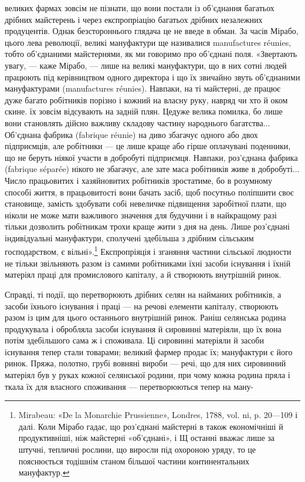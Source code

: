 \parcont{}  %
великих фармах зовсім не пізнати, що вони постали із об’єднання
багатьох дрібних майстерень і через експропріацію багатьох
дрібних незалежних продуцентів. Однак безстороннього глядача
це не введе в обман. За часів Мірабо, цього лева революції, великі
мануфактури ще називалися manufactures réunies, тобто об’єднаними
майстернями, як ми говоримо про об’єднані поля. «Звертають
увагу, — каже Мірабо, — лише на великі мануфактури,
що в них сотні людей працюють під керівництвом одного директора
і що їх звичайно звуть об’єднаними мануфактурами (manufactures
réunies). Навпаки, на ті майстерні, де працює дуже багато
робітників порізно і кожний на власну руку, навряд чи
хто й оком скине. їх зовсім відсувають на задній плян. Цедуже
велика помилка, бо лише вони становлять дійсно важливу складову
частину народнього багатства... Об’єднана фабрика (fabrique
réunie) на диво збагачує одного або двох підприємців, але
робітники — це лише краще або гірше оплачувані поденники,
що не беруть ніякої участи в добробуті підприємця. Навпаки,
роз’єднана фабрика (fabrique séparée) нікого не збагачує, але
зате маса робітників живе в добробуті... Число працьовитих і
хазяйновитих робітників зростатиме, бо в розумному способі
життя, в працьовитості вони бачать засіб, щоб посутньо поліпшити
своє становище, замість здобувати собі невеличке підвищення
заробітної плати, що ніколи не може мати важливого
значення для будучини і в найкращому разі тільки дозволить
робітникам трохи краще жити з дня на день. Лише роз’єднані
індивідуальні мануфактури, сполучені здебільша з дрібним сільським
господарством, є вільні».\footnote{
Mirabeau: «De la Monarchie Prussienne», Londres, 1788, vol. ni,
p. 20—109 і далі. Коли Мірабо гадає, що роз’єднані майстерні в
також економічніші й продуктивніші, ніж майстерні «об’єднані», і Щ
останні вважає лише за штучні, тепличні рослини, що виросли під охороною
уряду, то це пояснюється тодішнім станом більшої частини континентальних
мануфактур.
} Експропріяція і зганяння
частини сільської людности не тільки звільняють разом із самими
робітниками їхні засоби існування і їхній матеріял праці для
промислового капіталу, а й створюють внутрішній ринок.

Справді, ті події, що перетворюють дрібних селян на найманих
робітників, а засоби їхнього існування і праці — на речові
елементи капіталу, створюють разом із цим для цього останнього
внутрішній ринок. Раніш селянська родина продукувала
і обробляла засоби існування й сировинні матеріяли, що їх вона
потім здебільшого сама ж і споживала. Ці сировинні матеріяли
й засоби існування тепер стали товарами; великий фармер продає
їх; мануфактури є його ринок. Пряжа, полотно, грубі вовняні
вироби — речі, що для них сировинний матеріял був у руках
кожної селянської родини, при чому кожна родина пряла і ткала
їх для власного споживання — перетворюються тепер на ману-

